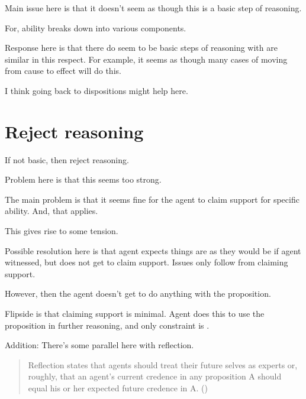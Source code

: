 \begin{note}
  Main issue here is that it doesn't seem as though this is a basic step of reasoning.

  For, ability breaks down into various components.

  Response here is that there do seem to be basic steps of reasoning with are similar in this respect.
  For example, it seems as though many cases of moving from cause to effect will do this.

  I think going back to dispositions might help here.
\end{note}

\section{Reject reasoning}
\label{sec:reject-reasoning}

\begin{note}
  If not basic, then reject reasoning.
\end{note}

\begin{note}
  Problem here is that this seems too strong.
\end{note}

\begin{note}
  The main problem is that it seems fine for the agent to claim support for specific ability.
  And, that  applies.

  This gives rise to some tension.

  Possible resolution here is that agent expects things are as they would be if agent witnessed, but does not get to claim support.
  Issues only follow from claiming support.

  However, then the agent doesn't get to do anything with the proposition.

  Flipside is that claiming support is minimal.
  Agent does this to use the proposition in further reasoning, and only constraint is \ideaCS{}.
\end{note}

\begin{note}
  Addition:
  There's some parallel here with reflection.
\end{note}

\begin{note}[Reflection]
\begin{quote}
    Reflection states that agents should treat their future selves as experts or, roughly, that an agent’s current credence in any proposition A should equal his or her expected future credence in A.\linebreak
    \mbox{}\hfill\mbox{(\Citeyear[59]{Briggs:2009up})}
  \end{quote}
\end{note}

